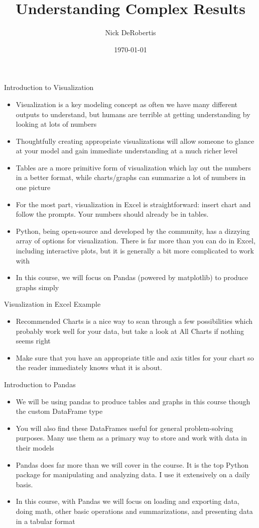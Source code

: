 \documentclass[]{article}
\begin{document}
\title{Understanding Complex Results}
\author{Nick DeRobertis}
\date{\today}
\maketitle
\begin{section}{Introduction to Visualization}
\begin{itemize}
\item Visualization is a key modeling concept as often we have many different outputs to understand, but humans are terrible at getting understanding by looking at lots of numbers
\item Thoughtfully creating appropriate visualizations will allow someone to glance at your model and gain immediate understanding at a much richer level
\item Tables are a more primitive form of visualization which lay out the numbers in a better format, while charts/graphs can summarize a lot of numbers in one picture
\item For the most part, visualization in Excel is straightforward: insert chart and follow the prompts. Your numbers should already be in tables.
\item Python, being open-source and developed by the community, has a dizzying array of options for visualization. There is far more than you can do in Excel, including interactive plots, but it is generally a bit more complicated to work with
\item In this course, we will focus on Pandas (powered by matplotlib) to produce graphs simply
\end{itemize}
\end{section}
\begin{section}{Visualization in Excel Example}
\begin{itemize}
\item Recommended Charts is a nice way to scan through a few possibilities which probably work well for your data, but take a look at All Charts if nothing seems right
\item Make sure that you have an appropriate title and axis titles for your chart so the reader immediately knows what it is about.
\end{itemize}
\end{section}
\begin{section}{Introduction to Pandas}
\begin{itemize}
\item We will be using pandas to produce tables and graphs in this course though the custom DataFrame type
\item You will also find these DataFrames useful for general problem-solving purposes. Many use them as a primary way to store and work with data in their models
\item Pandas does far more than we will cover in the course. It is the top Python package for manipulating and analyzing data. I use it extensively on a daily basis.
\item In this course, with Pandas we will focus on loading and exporting data, doing math, other basic operations and summarizations, and presenting data in a tabular format
\end{itemize}
\end{section}
\end{document}
